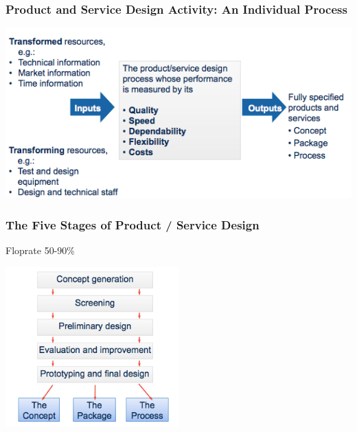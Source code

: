 \subsubsection{Product and Service Design Activity: An Individual Process}
\includegraphics[width=1\textwidth]{W03/individualprocess}
\subsubsection{The Five Stages of Product / Service Design}
Floprate 50-90\%\\
\begin{center}
\includegraphics[width=0.5\textwidth]{W03/5stages}
\end{center}
